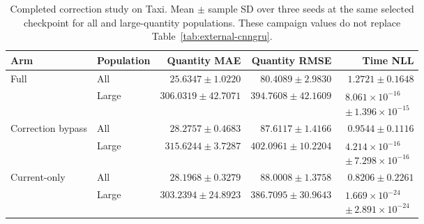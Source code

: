 \documentclass[runningheads]{llncs}
\begin{document}
\begin{table}[htbp]
\caption{Completed correction study on Taxi. Mean $\pm$ sample SD over three seeds at the same selected checkpoint for all and large-quantity populations. These campaign values do not replace Table~\ref{tab:external-cnngru}.}
\label{tab:history-six-yellow_trip_hourly}
\centering\small
\setlength{\tabcolsep}{3pt}
\renewcommand{\arraystretch}{1.12}
\begin{tabular}{@{}llrrr@{}}
\toprule
Arm & Population & Quantity MAE & Quantity RMSE & Time NLL\\
\midrule
Full & All & $25.6347\pm1.0220$ & $80.4089\pm2.9830$ & $1.2721\pm0.1648$\\
 & Large & $306.0319\pm42.7071$ & $394.7608\pm42.1609$ & $\begin{gathered}8.061\!\times\!10^{-16}\\{\scriptstyle\pm\,1.396\!\times\!10^{-15}}\end{gathered}$\\
\midrule
Correction bypass & All & $28.2757\pm0.4683$ & $87.6117\pm1.4166$ & $0.9544\pm0.1116$\\
 & Large & $315.6244\pm3.7287$ & $402.0961\pm10.2204$ & $\begin{gathered}4.214\!\times\!10^{-16}\\{\scriptstyle\pm\,7.298\!\times\!10^{-16}}\end{gathered}$\\
\midrule
Current-only & All & $28.1968\pm0.3279$ & $88.0008\pm1.3758$ & $0.8206\pm0.2261$\\
 & Large & $303.2394\pm24.8923$ & $386.7095\pm30.9643$ & $\begin{gathered}1.669\!\times\!10^{-24}\\{\scriptstyle\pm\,2.891\!\times\!10^{-24}}\end{gathered}$\\
\bottomrule
\end{tabular}
\end{table}
\end{document}
